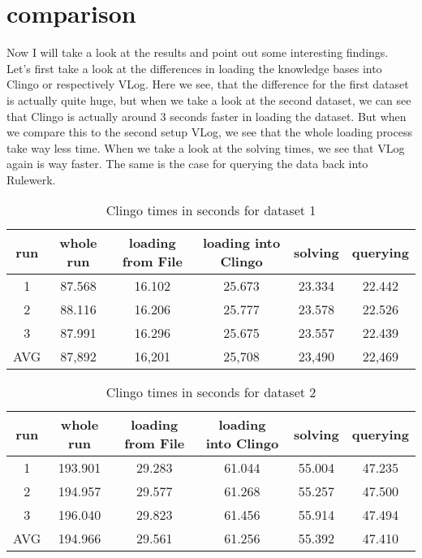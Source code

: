 \documentclass[hyperref, bachelorofscience]{cgvpub}
\begin{document}
\section{comparison}
Now I will take a look at the results and point out some interesting findings. Let's first take a look at the differences in loading the knowledge bases into Clingo or respectively VLog. Here we see, that the difference for the first dataset is actually quite huge, but when we take a look at the second dataset, we can see that Clingo is actually around 3 seconds faster in loading the dataset. But when we compare this to the second setup VLog, we see that the whole loading process take way less time. When we take a look at the solving times, we see that VLog again is way faster. The same is the case for querying the data back into Rulewerk.
  


\begin{table}
\center
\begin{tabular}{|c|c|c|c|c|c|}
\hline
run & whole run & loading from File & loading into Clingo & solving & querying \\
\hline
\hline
1 & 87.568 & 16.102 & 25.673 & 23.334 & 22.442 \\
2 & 88.116 & 16.206 & 25.777 & 23.578 & 22.526 \\
3 & 87.991 & 16.296 & 25.675 & 23.557 & 22.439 \\
\hline
AVG & 87,892 & 16,201 & 25,708 & 23,490 & 22,469 \\
\hline

\end{tabular}
\caption{Clingo times in seconds for dataset 1}
\end{table}

\begin{table}
\center
\begin{tabular}{|c|c|c|c|c|c|}
\hline
run & whole run & loading from File & loading into Clingo & solving & querying \\
\hline
\hline
1 & 193.901 & 29.283 & 61.044 & 55.004 & 47.235 \\
2 & 194.957 & 29.577 & 61.268 & 55.257 & 47.500 \\
3 & 196.040 & 29.823 & 61.456 & 55.914 & 47.494 \\
AVG & 194.966 & 29.561 & 61.256 & 55.392 & 47.410 \\
\hline

\end{tabular}
\caption{Clingo times in seconds for dataset 2}
\end{table}
\end{document}
